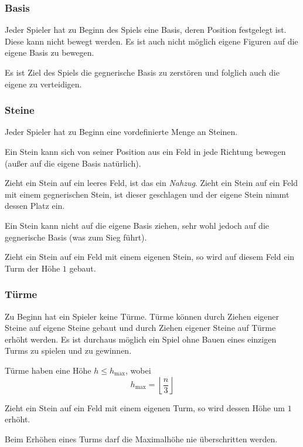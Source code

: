 \subsubsection*{Basis}
Jeder Spieler hat zu Beginn des Spiels eine Basis, deren Position festgelegt ist. Diese kann nicht bewegt werden. Es ist auch nicht möglich eigene Figuren auf die eigene Basis zu bewegen.

Es ist Ziel des Spiels die gegnerische Basis zu zerstören und folglich auch die eigene zu verteidigen.

\subsubsection*{Steine}
Jeder Spieler hat zu Beginn eine vordefinierte Menge an Steinen. 

Ein Stein kann sich von seiner Position aus ein Feld in jede Richtung bewegen (außer auf die eigene Basis natürlich).

Zieht ein Stein auf ein leeres Feld, ist das ein \emph{Nahzug}. Zieht ein Stein auf ein Feld mit einem gegnerischen Stein, ist dieser geschlagen und der eigene Stein nimmt dessen Platz ein.

Ein Stein kann nicht auf die eigene Basis ziehen, sehr wohl jedoch auf die gegnerische Basis (was zum Sieg führt).

Zieht ein Stein auf ein Feld mit einem eigenen Stein, so wird auf diesem Feld ein Turm der Höhe $1$ gebaut.

\subsubsection*{Türme}
Zu Beginn hat ein Spieler keine Türme. Türme können durch Ziehen eigener Steine auf eigene Steine gebaut und durch Ziehen eigener Steine auf Türme erhöht werden. Es ist durchaus möglich ein Spiel ohne Bauen eines einzigen Turms zu spielen und zu gewinnen.

Türme haben eine Höhe $h \le h_\text{max}$, wobei \[h_\text{max} = \left\lfloor \frac{n}{3}\right\rfloor\]

Zieht ein Stein auf ein Feld mit einem eigenen Turm, so wird dessen Höhe um $1$ erhöht.

Beim Erhöhen eines Turms darf die Maximalhöhe nie überschritten werden.

